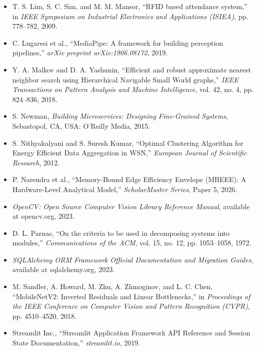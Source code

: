 \documentclass[12pt,a4paper,oneside]{report}
\begin{document}
\begin{itemize}
    \item T. S. Lim, S. C. Sim, and M. M. Mansor, ``RFID based attendance system,'' in \textit{IEEE Symposium on Industrial Electronics and Applications (ISIEA)}, pp. 778--782, 2009.
    \item C. Lugaresi et al., ``MediaPipe: A framework for building perception pipelines,'' \textit{arXiv preprint arXiv:1906.08172}, 2019.
    \item Y. A. Malkov and D. A. Yashunin, ``Efficient and robust approximate nearest neighbor search using Hierarchical Navigable Small World graphs,'' \textit{IEEE Transactions on Pattern Analysis and Machine Intelligence}, vol. 42, no. 4, pp. 824--836, 2018.
    \item S. Newman, \textit{Building Microservices: Designing Fine-Grained Systems}, Sebastopol, CA, USA: O'Reilly Media, 2015.
    \item S. Nithyakalyani and S. Suresh Kumar, ``Optimal Clustering Algorithm for Energy Efficient Data Aggregation in WSN,'' \textit{European Journal of Scientific Research}, 2012.
    \item P. Narendra et al., ``Memory-Bound Edge Efficiency Envelope (MBEEE): A Hardware-Level Analytical Model,'' \textit{ScholarMaster Series}, Paper 5, 2026.
    \item \textit{OpenCV: Open Source Computer Vision Library Reference Manual}, available at opencv.org, 2023.
    \item D. L. Parnas, ``On the criteria to be used in decomposing systems into modules,'' \textit{Communications of the ACM}, vol. 15, no. 12, pp. 1053--1058, 1972.
    \item \textit{SQLAlchemy ORM Framework Official Documentation and Migration Guides}, available at sqlalchemy.org, 2023.
    \item M. Sandler, A. Howard, M. Zhu, A. Zhmoginov, and L. C. Chen, ``MobileNetV2: Inverted Residuals and Linear Bottlenecks,'' in \textit{Proceedings of the IEEE Conference on Computer Vision and Pattern Recognition (CVPR)}, pp. 4510--4520, 2018.
    \item Streamlit Inc., ``Streamlit Application Framework API Reference and Session State Documentation,'' \textit{streamlit.io}, 2019.
\end{itemize}

\clearpage
\appendix
\end{document}
